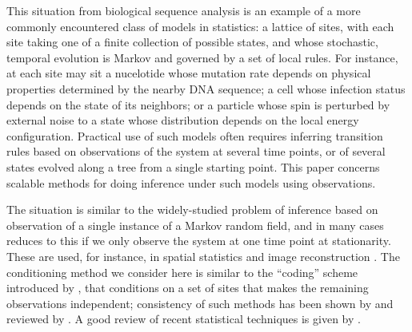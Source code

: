 \documentclass{article}
\theoremstyle{plain}
\theoremstyle{definition}
\begin{document}
This situation from biological sequence analysis
is an example of a more commonly encountered class of models in statistics:
a lattice of sites,
with each site taking one of a finite collection of possible states,
and whose stochastic, temporal evolution is Markov and governed by a set of local rules.
For instance, at each site may sit
a nucelotide whose mutation rate depends on physical properties determined by the nearby DNA sequence;
a cell whose infection status depends on the state of its neighbors;
or a particle whose spin is perturbed by external noise to a state whose distribution depends on the local energy configuration.
Practical use of such models often requires
inferring transition rules
based on observations of the system at several time points,
or of several states evolved along a tree from a single starting point.
This paper concerns scalable methods for doing inference under such models using observations.

The situation is similar to the widely-studied problem of inference based on observation
of a single instance of a Markov random field,
and in many cases reduces to this if we only observe the system at one time point at stationarity.
These are used, for instance, in spatial statistics \citep{besag1972nearestneighbour,gelfand2010handbook}
and image reconstruction \citep{geman1984stochastic,besag1986statistical}.
The conditioning method we consider here
is similar to the ``coding'' scheme introduced by \citet{besag1974spatial},
that conditions on a set of sites that makes the remaining observations independent;
consistency of such methods has been shown by \citet{comets1992consistency} and reviewed by \citet{larribe2011composite}.
A good review of recent statistical techniques is given by \citet{friel2012bayesian}.
\end{document}
